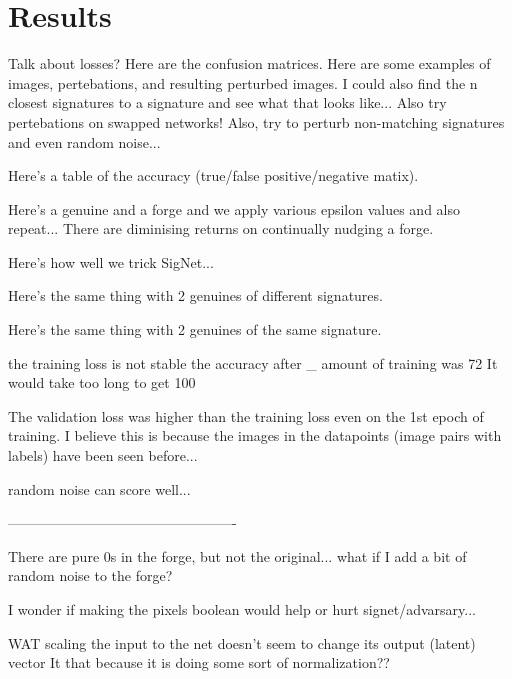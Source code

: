 \section{Results}\label{sec:results}

Talk about losses?
Here are the confusion matrices.
Here are some examples of images, pertebations, and resulting perturbed images.
I could also find the n closest signatures to a signature and see what that looks like...
Also try pertebations on swapped networks!
Also, try to perturb non-matching signatures and even random noise...

Here's a table of the accuracy (true/false positive/negative matix).

Here's a genuine and a forge and we apply various epsilon values and also repeat...
    There are diminising returns on continually nudging a forge.

Here's how well we trick SigNet...

Here's the same thing with 2 genuines of different signatures.

Here's the same thing with 2 genuines of the same signature.


the training loss is not stable
the accuracy after \_ amount of training was 72%
It would take too long to get 100%

The validation loss was higher than the training loss even on the 1st epoch of training.
I believe this is because the images in the datapoints (image pairs with labels) have been seen before...


random noise can score well...

-------------------------------------------------

There are pure 0s in the forge, but not the original...
what if I add a bit of random noise to the forge?

I wonder if making the pixels boolean would help or hurt signet/advarsary...





WAT
    scaling the input to the net doesn't seem to change its output (latent) vector
    It that because it is doing some sort of normalization??
